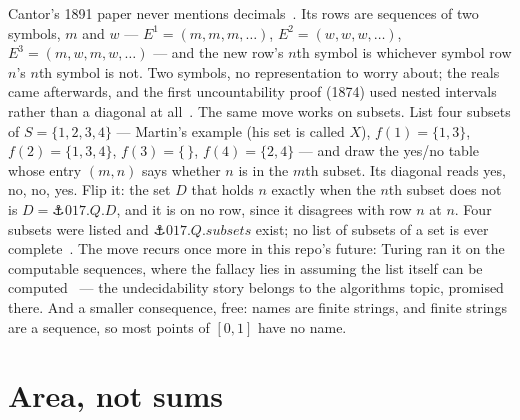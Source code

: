 \begin{narrative}
Cantor's 1891 paper never mentions
decimals~\cite{probability-cantor-ueber-eine-elementare-frage-der-mannigfaltigkeitslehr}.
Its rows are sequences of two symbols, $m$ and $w$ — $E^1 = (m, m, m,
\ldots)$, $E^2 = (w, w, w, \ldots)$, $E^3 = (m, w, m, w, \ldots)$ — and
the new row's $n$th symbol is whichever symbol row $n$'s $n$th symbol
is not. Two symbols, no representation to worry about; the reals came
afterwards, and the first uncountability proof (1874) used nested
intervals rather than a diagonal at
all~\cite{probability-georg-cantor-ueber-eine-eigenschaft-des-inbegriffs-crelle-77,probability-knapp-and-silva-the-uncountability-of-the-unit-interval-arxi}.
The same move works on subsets. List four subsets of $S = \{1, 2, 3,
4\}$ — Martin's example (his set is called $X$), $f(1) = \{1, 3\}$, $f(2) = \{1, 3, 4\}$, $f(3)
= \{\,\}$, $f(4) = \{2, 4\}$ — and draw the yes/no table whose entry
$(m, n)$ says whether $n$ is in the $m$th subset. Its diagonal reads
yes, no, no, yes. Flip it: the set $D$ that holds $n$ exactly when the
$n$th subset does not is $D = \anchor{017.Q.D}$, and it is on no row,
since it disagrees with row $n$ at $n$. Four subsets were listed and
$\anchor{017.Q.subsets}$ exist; no list of subsets of a set is ever
complete~\cite{probability-wikipedia-cantor-s-theorem}. The move recurs
once more in this repo's future: Turing ran it on the computable
sequences, where the fallacy lies in assuming the list itself can be
computed~\cite{probability-a-m-turing-on-computable-numbers-proc-lms-1936-37,probability-wikipedia-turing-s-proof}
— the undecidability story belongs to the algorithms topic, promised
there. And a smaller consequence, free: names are finite strings, and
finite strings are a sequence, so most points of $[0,1]$ have no name.

\section{Area, not sums}


\end{narrative}

